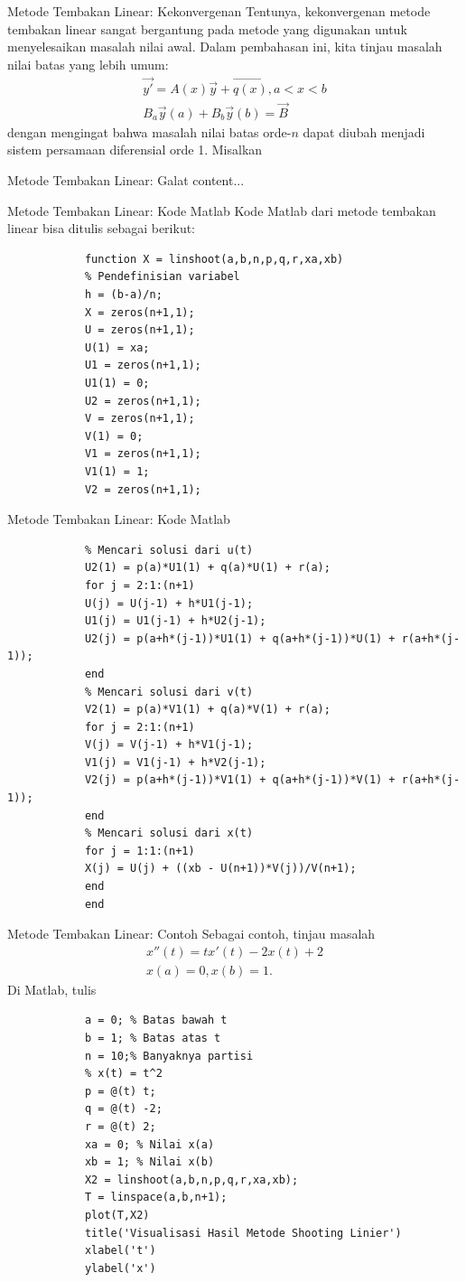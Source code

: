 \documentclass[xcolor={dvipsnames}, 9pt]{beamer}
\begin{document}
    \begin{frame}{Metode Tembakan Linear: Kekonvergenan}
    	Tentunya, kekonvergenan metode tembakan linear sangat bergantung pada metode yang digunakan untuk menyelesaikan masalah nilai awal. Dalam pembahasan ini, kita tinjau masalah nilai batas yang lebih umum:
    	\begin{gather*}
    		\vec{y'} = A(x)\vec{y} + \vec{q(x)}, a<x<b \\
    		B_a\vec{y}(a) + B_b\vec{y}(b) = \vec{B}
    	\end{gather*}
    	dengan mengingat bahwa masalah nilai batas orde-$n$ dapat diubah menjadi sistem persamaan diferensial orde 1. Misalkan 
    \end{frame}
    \begin{frame}{Metode Tembakan Linear: Galat}
    	content...
    \end{frame}
    \begin{frame}[fragile]{Metode Tembakan Linear: Kode Matlab}
    	Kode Matlab dari metode tembakan linear bisa ditulis sebagai berikut:
		\begin{verbatim}
			function X = linshoot(a,b,n,p,q,r,xa,xb)
			% Pendefinisian variabel
			h = (b-a)/n;
			X = zeros(n+1,1);
			U = zeros(n+1,1);
			U(1) = xa;
			U1 = zeros(n+1,1);
			U1(1) = 0;
			U2 = zeros(n+1,1);
			V = zeros(n+1,1);
			V(1) = 0;
			V1 = zeros(n+1,1);
			V1(1) = 1;
			V2 = zeros(n+1,1);
		\end{verbatim}
	\end{frame}
	\begin{frame}[fragile]{Metode Tembakan Linear: Kode Matlab}
		\begin{verbatim}
			% Mencari solusi dari u(t)
			U2(1) = p(a)*U1(1) + q(a)*U(1) + r(a);
			for j = 2:1:(n+1)
			U(j) = U(j-1) + h*U1(j-1);
			U1(j) = U1(j-1) + h*U2(j-1);
			U2(j) = p(a+h*(j-1))*U1(1) + q(a+h*(j-1))*U(1) + r(a+h*(j-1));
			end
			% Mencari solusi dari v(t)
			V2(1) = p(a)*V1(1) + q(a)*V(1) + r(a);
			for j = 2:1:(n+1)
			V(j) = V(j-1) + h*V1(j-1);
			V1(j) = V1(j-1) + h*V2(j-1);
			V2(j) = p(a+h*(j-1))*V1(1) + q(a+h*(j-1))*V(1) + r(a+h*(j-1));
			end
			% Mencari solusi dari x(t)
			for j = 1:1:(n+1)
			X(j) = U(j) + ((xb - U(n+1))*V(j))/V(n+1);
			end
			end
		\end{verbatim}
	\end{frame}
    \begin{frame}[fragile]{Metode Tembakan Linear: Contoh}
    	Sebagai contoh, tinjau masalah
    	\begin{align*}
    		x''(t) = tx'(t) - 2x(t) + 2 \\
    		x(a) = 0, x(b) = 1.
    	\end{align*}
    	Di Matlab, tulis
    	\begin{verbatim}
    		a = 0; % Batas bawah t
    		b = 1; % Batas atas t
    		n = 10;% Banyaknya partisi
    		% x(t) = t^2
    		p = @(t) t;
    		q = @(t) -2;
    		r = @(t) 2;
    		xa = 0; % Nilai x(a)
    		xb = 1; % Nilai x(b)
    		X2 = linshoot(a,b,n,p,q,r,xa,xb);
    		T = linspace(a,b,n+1);
    		plot(T,X2)
    		title('Visualisasi Hasil Metode Shooting Linier')
    		xlabel('t')
    		ylabel('x')
    	\end{verbatim}
    \end{frame}
\end{document}
